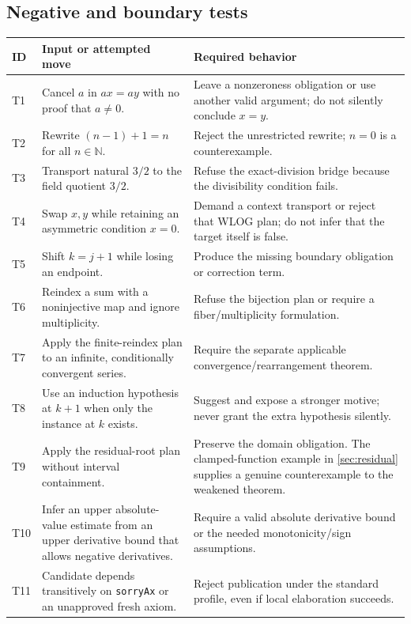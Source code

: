\documentclass[11pt,a4paper]{article}
\newcommand{\code}[1]{\nolinkurl{#1}}
\newcommand{\N}{\mathbb N}
\theoremstyle{definition}
\theoremstyle{remark}
\numberwithin{equation}{section}
\begin{document}
\subsection*{Negative and boundary tests}
\begin{longtable}{@{}P{.06\linewidth}P{.43\linewidth}P{.43\linewidth}@{}}
\toprule
ID & Input or attempted move & Required behavior \\
\midrule
\endhead
T1 & Cancel $a$ in $ax=ay$ with no proof that $a\ne0$. & Leave a nonzeroness obligation or use another valid argument; do not silently conclude $x=y$. \\
\addlinespace
T2 & Rewrite $(n-1)+1=n$ for all $n\in\N$. & Reject the unrestricted rewrite; $n=0$ is a counterexample. \\
\addlinespace
T3 & Transport natural $3/2$ to the field quotient $3/2$. & Refuse the exact-division bridge because the divisibility condition fails. \\
\addlinespace
T4 & Swap $x,y$ while retaining an asymmetric condition $x=0$. & Demand a context transport or reject that WLOG plan; do not infer that the target itself is false. \\
\addlinespace
T5 & Shift $k=j+1$ while losing an endpoint. & Produce the missing boundary obligation or correction term. \\
\addlinespace
T6 & Reindex a sum with a noninjective map and ignore multiplicity. & Refuse the bijection plan or require a fiber/multiplicity formulation. \\
\addlinespace
T7 & Apply the finite-reindex plan to an infinite, conditionally convergent series. & Require the separate applicable convergence/rearrangement theorem. \\
\addlinespace
T8 & Use an induction hypothesis at $k+1$ when only the instance at $k$ exists. & Suggest and expose a stronger motive; never grant the extra hypothesis silently. \\
\addlinespace
T9 & Apply the residual-root plan without interval containment. & Preserve the domain obligation. The clamped-function example in \cref{sec:residual} supplies a genuine counterexample to the weakened theorem. \\
\addlinespace
T10 & Infer an upper absolute-value estimate from an upper derivative bound that allows negative derivatives. & Require a valid absolute derivative bound or the needed monotonicity/sign assumptions. \\
\addlinespace
T11 & Candidate depends transitively on \code{sorryAx} or an unapproved fresh axiom. & Reject publication under the standard profile, even if local elaboration succeeds. \\

\end{longtable}
\end{document}
